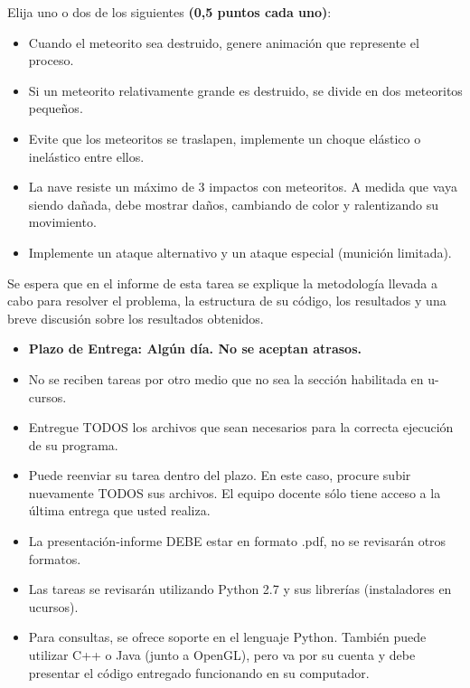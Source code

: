 \documentclass[letterpaper,11pt]{article} %
\def\plazoentrega {Algún día}
\begin{document}

Elija uno o dos de los siguientes \textbf{(0,5 puntos cada uno)}:

\begin{itemize}
	\item Cuando el meteorito sea destruido, genere animación que represente el proceso.
	\item Si un meteorito relativamente grande es destruido, se divide en dos meteoritos pequeños.
	\item Evite que los meteoritos se traslapen, implemente un choque elástico o inelástico entre ellos.
	\item La nave resiste un máximo de 3 impactos con meteoritos. A medida que vaya siendo dañada, debe mostrar daños, cambiando de color y ralentizando su movimiento.
	\item Implemente un ataque alternativo y un ataque especial (munición limitada).
\end{itemize}


Se espera que en el informe de esta tarea se explique la metodología llevada a cabo para resolver el problema, la estructura de su código, los resultados y una breve discusión sobre los resultados obtenidos. 


\begin{itemize}
	\item \textbf{Plazo de Entrega: \plazoentrega. No se aceptan atrasos.}
	\item No se reciben tareas por otro medio que no sea la sección habilitada en u-cursos.
	\item Entregue TODOS los archivos que sean necesarios para la correcta ejecución de su programa.
	\item Puede reenviar su tarea dentro del plazo. En este caso, procure subir nuevamente TODOS sus archivos. El equipo docente sólo tiene acceso a la última entrega que usted realiza.
	\item La presentación-informe DEBE estar en formato .pdf, no se revisarán otros formatos.
	\item Las tareas se revisarán utilizando Python 2.7 y sus librerías (instaladores en ucursos).
	\item Para consultas, se ofrece soporte en el lenguaje Python. También puede utilizar C++ o Java (junto a OpenGL), pero va por su cuenta y debe presentar el código entregado funcionando en su computador.
\end{itemize}
\end{document}
